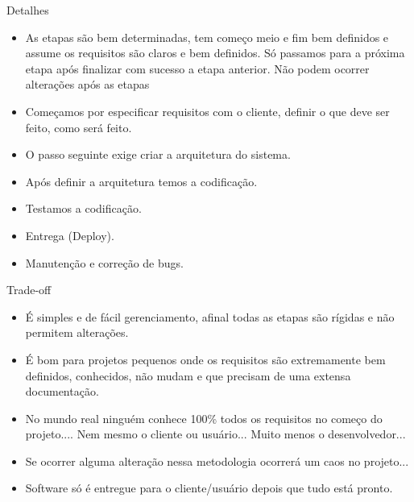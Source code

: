 \begin{frame}
\begin{block}{Detalhes}
	 \begin{itemize}
			 \item As etapas são bem determinadas, tem começo meio e fim bem definidos e assume os requisitos são claros e bem definidos. Só passamos para a próxima etapa após finalizar com sucesso a etapa anterior. Não podem ocorrer alterações após as etapas

			 \item Começamos por especificar requisitos com o cliente, definir o que deve ser feito, como será feito.
			
			 \item O passo seguinte exige criar a arquitetura do sistema.
			
			 \item Após definir a arquitetura temos a codificação.
			
			 \item Testamos a codificação.
			
			 \item Entrega (Deploy).
			
			 \item Manutenção e correção de bugs.
	 \end{itemize}
\end{block}
\end{frame}

\begin{frame}
\begin{block}{Trade-off}
	 \begin{itemize}
			\item É simples e de fácil gerenciamento, afinal todas as etapas são rígidas e não permitem alterações.

			\item É bom para projetos pequenos onde os requisitos são extremamente bem definidos, conhecidos, não mudam e que precisam de uma extensa documentação.
			
			\item No mundo real ninguém conhece 100\% todos os requisitos no começo do projeto.... Nem mesmo o cliente ou usuário... Muito menos o desenvolvedor...
			
			\item Se ocorrer alguma alteração nessa metodologia ocorrerá um caos no projeto...
			
			\item Software só é entregue para o cliente/usuário depois que tudo está pronto.

	 \end{itemize}
\end{block}
\end{frame}

